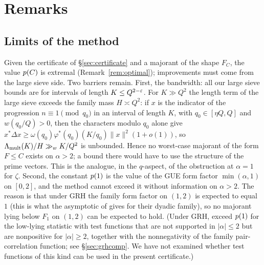 \documentclass[11pt]{amsart}
\theoremstyle{definition}
\theoremstyle{remark}
\numberwithin{equation}{section}
\begin{document}
\section{Remarks}\label{sec:remarks}

\subsection{Limits of the method}\label{sec:limits}
Given the certificate of \S\ref{sec:certificate} and a majorant of the shape $F_C$, the value $p(C)$ is extremal (Remark~\ref{rem:optimal}); improvements must come from the large sieve side. Two barriers remain. First, the bandwidth: all our large sieve bounds are for intervals of length $K\le Q^{2-\varepsilon}$. For $K\gg Q^2$ the length term of the large sieve exceeds the family mass $H\asymp Q^2$: if $x$ is the indicator of the progression $n\equiv1\pmod{q_0}$ in an interval of length $K$, with $q_0\in[\eta Q,Q]$ and $w(q_0/Q)>0$, then the characters modulo $q_0$ alone give $x^*\Delta x\ge\omega(q_0)\varphi^*(q_0)(K/q_0)\|x\|^2(1+o(1))$, so $\Lambda_{\mathrm{mult}}(K)/H\gg_wK/Q^2$ is unbounded. Hence no worst-case majorant of the form $F\le C$ exists on $\alpha>2$; a bound there would have to use the structure of the prime vectors. This is the analogue, in the $q$-aspect, of the obstruction at $\alpha=1$ for $\zeta$. Second, the constant $p(1)$ is the value of the GUE form factor $\min(\alpha,1)$ on $[0,2]$, and the method cannot exceed it without information on $\alpha>2$. The reason is that under GRH the family form factor on $(1,2)$ is expected to equal $1$ (this is what the asymptotic of \cite{CLLR} gives for their dyadic family), so no majorant lying below $F_1$ on $(1,2)$ can be expected to hold. (Under GRH, \cite{CGdL} exceed $p(1)$ for the low-lying statistic with test functions that are not supported in $|\alpha|\le2$ but are nonpositive for $|\alpha|\ge2$, together with the nonnegativity of the family pair-correlation function; see \S\ref{sec:grhcomp}. We have not examined whether test functions of this kind can be used in the present certificate.)
\end{document}
